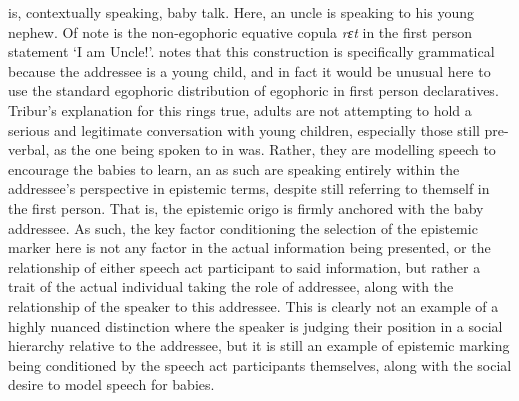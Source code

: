  is, contextually speaking, baby talk. Here, an uncle is speaking to his young nephew. Of note is the non-egophoric equative copula \textit{rɛt} in the first person statement `I am Uncle!'.  notes that this construction is specifically grammatical because the addressee is a young child, and in fact it would be unusual here to use the standard egophoric distribution of egophoric in first person declaratives. Tribur's explanation for this rings true, adults are not attempting to hold a serious and legitimate conversation with young children, especially those still pre-verbal, as the one being spoken to in  was. Rather, they are modelling speech to encourage the babies to learn, an as such are speaking entirely within the addressee's perspective in epistemic terms, despite still referring to themself in the first person. That is, the epistemic origo is firmly anchored with the baby addressee. As such, the key factor conditioning the selection of the epistemic marker here is not any factor in the actual information being presented, or the relationship of either speech act participant to said information, but rather a trait of the actual individual taking the role of addressee, along with the relationship of the speaker to this addressee. This is clearly not an example of a highly nuanced distinction where the speaker is judging their position in a social hierarchy relative to the addressee, but it is still an example of epistemic marking being conditioned by the speech act participants themselves, along with the social desire to model speech for babies.

